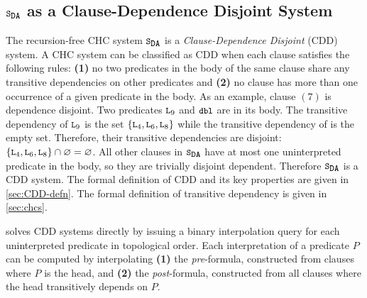 \subsection{$\mcchc$ as a Clause-Dependence Disjoint System}
\label{sec:solve-ex}
The recursion-free CHC system $\mcchc$ is a
\emph{Clause-Dependence Disjoint} (CDD) system.
A CHC system can be classified as CDD when each clause satisfies the
following rules:
%
\textbf{(1)} no two predicates in the body of the same clause share
any transitive dependencies on other predicates and
\textbf{(2)} no clause has more than one occurrence of a given
predicate in the body.
As an example, clause $(7)$ is dependence disjoint. 
%
Two predicates $\cc{L}_9$ and $\cc{dbl}$ are in its body.
%
The transitive dependency of $\cc{L}_9$ is the set
$\{\cc{L}_4,\cc{L}_6,\cc{L}_8\}$ while the transitive dependency of
 is the empty set.
%
Therefore, their transitive dependencies are disjoint:
$\{\cc{L}_4,\cc{L}_6,\cc{L}_8\} \cap \varnothing = \varnothing$.
%
All other clauses in $\mcchc$ have at most one uninterpreted predicate
in the body, so they are trivially disjoint dependent.
%
Therefore $\mcchc$ is a CDD system.
%
%
The formal definition of CDD and its key properties are given in
\autoref{sec:CDD-defn}.
The formal definition of transitive dependency is given in
\autoref{sec:chcs}.
%

\sys solves CDD systems directly by issuing a binary interpolation
query for each uninterpreted predicate in topological order.
%
Each interpretation of a predicate $P$ can be computed by
interpolating
\textbf{(1)} the \emph{pre}-formula, constructed from clauses where
$P$ is the head, and
\textbf{(2)} the \emph{post}-formula, constructed from
all clauses where the head transitively depends on $P$.
%

